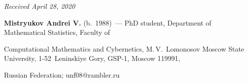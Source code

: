 


\hfill{\small\textit{Received April 28, 2020}} 






\Contrl



\noindent

\textbf{Mistryukov Andrei V.} (b.\ 1988)~--- PhD student, Department of Mathematical Statistics, Faculty of

 Computational Mathematics and Cybernetics, M.\,V.~Lo\-mo\-no\-sov Moscow State University, 1-52~Leninskiye Gory, GSP-1, Moscow 119991, 

 Russian Federation; \mbox{unf08@rambler.ru}

\label{end\stat}



\renewcommand{\bibname}{\protect\rm Литература} 

